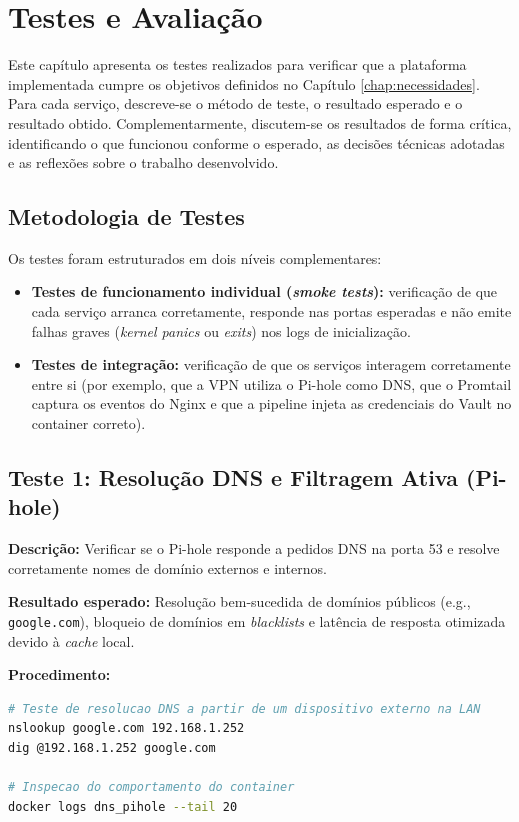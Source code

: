 \chapter{Testes e Avaliação}
\label{cap:test}

Este capítulo apresenta os testes realizados para verificar que a plataforma implementada cumpre os objetivos definidos no Capítulo \ref{chap:necessidades}. Para cada serviço, descreve-se o método de teste, o resultado esperado e o resultado obtido. Complementarmente, discutem-se os resultados de forma crítica, identificando o que funcionou conforme o esperado, as decisões técnicas adotadas e as reflexões sobre o trabalho desenvolvido.

\section{Metodologia de Testes}

Os testes foram estruturados em dois níveis complementares:

\begin{itemize}
    \item \textbf{Testes de funcionamento individual (\textit{smoke tests}):} verificação de que cada serviço arranca corretamente, responde nas portas esperadas e não emite falhas graves (\textit{kernel panics} ou \textit{exits}) nos logs de inicialização.
    \item \textbf{Testes de integração:} verificação de que os serviços interagem corretamente entre si (por exemplo, que a VPN utiliza o Pi-hole como DNS, que o Promtail captura os eventos do Nginx e que a pipeline injeta as credenciais do Vault no container correto).
\end{itemize}

\section{Teste 1: Resolução DNS e Filtragem Ativa (Pi-hole)}

\textbf{Descrição:} Verificar se o Pi-hole responde a pedidos DNS na porta 53 e resolve corretamente nomes de domínio externos e internos.

\textbf{Resultado esperado:} Resolução bem-sucedida de domínios públicos (e.g., \texttt{google.com}), bloqueio de domínios em \textit{blacklists} e latência de resposta otimizada devido à \textit{cache} local.

\textbf{Procedimento:}
\begin{lstlisting}[language=bash, frame=single, breaklines=true]
# Teste de resolucao DNS a partir de um dispositivo externo na LAN
nslookup google.com 192.168.1.252
dig @192.168.1.252 google.com

# Inspecao do comportamento do container
docker logs dns_pihole --tail 20
\end{lstlisting}


